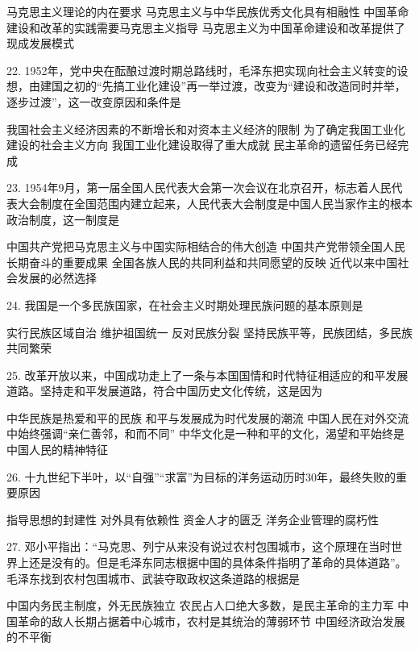\begin{choices}
	 马克思主义理论的内在要求
	 马克思主义与中华民族优秀文化具有相融性
	 中国革命建设和改革的实践需要马克思主义指导
	 马克思主义为中国革命建设和改革提供了现成发展模式
\end{choices}
22. 1952年，党中央在酝酿过渡时期总路线时，毛泽东把实现向社会主义转变的设想，由建国之初的“先搞工业化建设”再一举过渡，改变为“建设和改造同时并举，逐步过渡”，这一改变原因和条件是
\begin{choices}
	 我国社会主义经济因素的不断增长和对资本主义经济的限制
	 为了确定我国工业化建设的社会主义方向
	 我国工业化建设取得了重大成就
	 民主革命的遗留任务已经完成
\end{choices}
23. 1954年9月，第一届全国人民代表大会第一次会议在北京召开，标志着人民代表大会制度在全国范围内建立起来，人民代表大会制度是中国人民当家作主的根本政治制度，这一制度是
\begin{choices}
	 中国共产党把马克思主义与中国实际相结合的伟大创造
	 中国共产党带领全国人民长期奋斗的重要成果
	 全国各族人民的共同利益和共同愿望的反映
	 近代以来中国社会发展的必然选择
\end{choices}
24. 我国是一个多民族国家，在社会主义时期处理民族问题的基本原则是
\begin{choices}
	 实行民族区域自治
	 维护祖国统一
	 反对民族分裂
	 坚持民族平等，民族团结，多民族共同繁荣
\end{choices}
25. 改革开放以来，中国成功走上了一条与本国国情和时代特征相适应的和平发展道路。坚持走和平发展道路，符合中国历史文化传统，这是因为
\begin{choices}
	 中华民族是热爱和平的民族
	 和平与发展成为时代发展的潮流
	 中国人民在对外交流中始终强调“亲仁善邻，和而不同”
	 中华文化是一种和平的文化，渴望和平始终是中国人民的精神特征
\end{choices}
26. 十九世纪下半叶，以“自强”“求富”为目标的洋务运动历时30年，最终失败的重要原因
\begin{choices}
	 指导思想的封建性
	 对外具有依赖性
	 资金人才的匮乏
	 洋务企业管理的腐朽性
\end{choices}
27. 邓小平指出：“马克思、列宁从来没有说过农村包围城市，这个原理在当时世界上还是没有的。但是毛泽东同志根据中国的具体条件指明了革命的具体道路”。毛泽东找到农村包围城市、武装夺取政权这条道路的根据是
\begin{choices}
	 中国内务民主制度，外无民族独立
	 农民占人口绝大多数，是民主革命的主力军
	 中国革命的敌人长期占据着中心城市，农村是其统治的薄弱环节
	 中国经济政治发展的不平衡
\end{choices}

